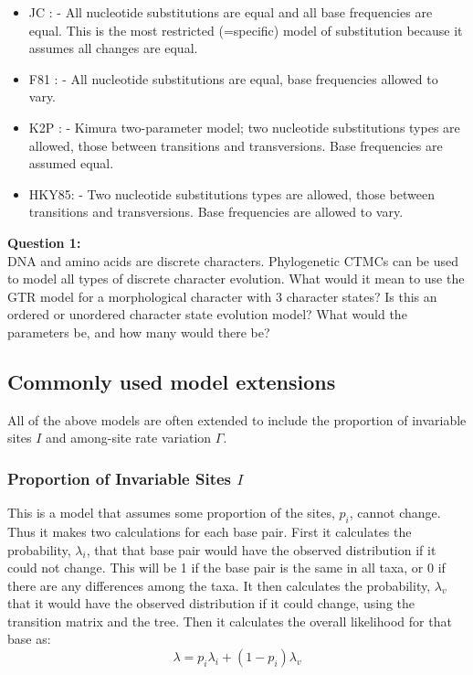 \documentclass[11pt]{article}
\begin{document}
\begin{itemize}

\item JC : \citet{jukes1969evolution} - All nucleotide substitutions are equal and all base frequencies are equal. This is the most restricted (=specific) model of substitution because it assumes all changes are equal.

\item F81 : \citet{felsenstein1981evolutionary} - All nucleotide substitutions are equal, base frequencies allowed to vary.

\item K2P : \citet{kimura1980simple} - Kimura two-parameter model; two nucleotide substitutions types are allowed, those between transitions and transversions. Base frequencies are assumed equal.

\item HKY85: \citet{hasegawa1985dating} - Two nucleotide substitutions types are allowed, those between transitions and transversions.  Base frequencies are allowed to vary.

\end{itemize}


\begin{framed}
\noindent
\textbf{Question 1:} \\
DNA and amino acids are discrete characters. Phylogenetic CTMCs can be used to model all types of discrete character evolution.
What would it mean to use the GTR model for a morphological character with 3 character states?
Is this an ordered or unordered character state evolution model?
What would the parameters be, and how many would there be?
\end{framed}

\subsection{Commonly used model extensions}

All of the above models are often extended to include the proportion of invariable sites $I$
and among-site rate variation $\Gamma$.

\subsubsection{Proportion of Invariable Sites $I$}

This is a model that assumes some proportion of the sites, $p_i$, cannot change.  
Thus it makes two calculations for each base pair.  
First it calculates the probability, $\lambda_i$, that that base pair would have the observed distribution if it could not change.  
This will be 1 if the base pair is the same in all taxa, or 0 if there are any differences among the taxa.  
It then calculates the probability, $\lambda_v$ that it would have the observed distribution if it could change, 
using the transition matrix and the tree.  
Then it calculates the overall likelihood for that base as:
\begin{equation*}
\lambda = p_i \lambda_i + (1 - p_i) \lambda_v
\end{equation*}
\end{document}
